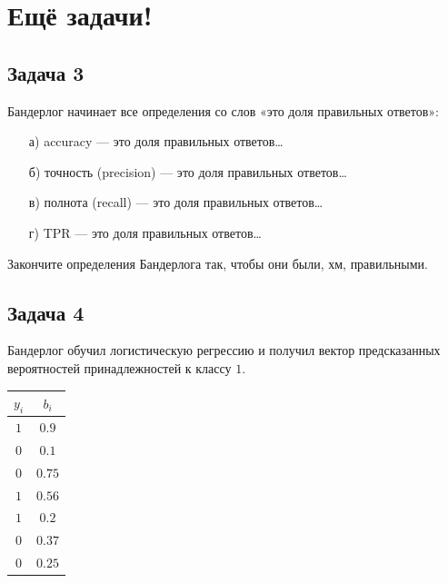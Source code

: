 \documentclass[12pt, a4paper, oneside]{article}
\begin{document}
\section*{Ещё задачи!}

\subsection*{Задача 3}

Бандерлог начинает все определения со слов «это доля правильных ответов»:
\begin{enumerate}
	\item[а)] accuracy — это доля правильных ответов\ldots
	\item[б)] точность (precision) — это доля правильных ответов\ldots
	\item[в)] полнота (recall) — это доля правильных ответов\ldots
	\item[г)] TPR — это доля правильных ответов\ldots
\end{enumerate}

Закончите определения Бандерлога так, чтобы они были, хм, правильными.



\subsection*{Задача 4}

Бандерлог обучил логистическую регрессию и получил вектор предсказанных вероятностей принадлежностей к классу $1$. 

\begin{center}
	\begin{tabular}{c|c}
		$y_i$ & $b_i$ \\
		\hline
		$1$  & $0.9$ \\
		$0$ & $0.1$ \\
		$0$ & $0.75$ \\
		$1$ & $0.56$ \\
		$1$ & $0.2$ \\
		$0$ & $0.37$ \\
		$0$ & $0.25$ \\		
	\end{tabular}
\end{center}
\end{document}
